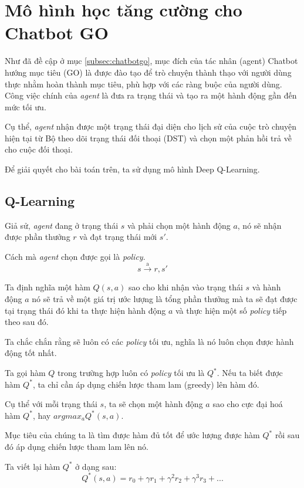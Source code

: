 \section{Mô hình học tăng cường cho Chatbot GO}
\label{sec:model}
Như đã đề cập ở mục \ref{subsec:chatbotgo}, mục đích của tác nhân
(agent) Chatbot hướng mục tiêu (GO) là được đào tạo để trò chuyện
thành thạo với người dùng thực nhằm hoàn thành mục tiêu, phù hợp với
các ràng buộc của người dùng. Công việc chính của \textit{agent} là
đưa ra trạng thái và tạo ra một hành động gần đến mức tối ưu.

Cụ thể, \textit{agent} nhận được một trạng thái đại diện cho lịch sử
của cuộc trò chuyện hiện tại từ Bộ theo dõi trạng thái đối thoại (DST)
và chọn một phản hồi trả về cho cuộc đối thoại.

Để giải quyết cho bài toán trên, ta sử dụng mô hình Deep Q-Learning.

\subsection{Q-Learning}
Giả sử, \textit{agent} đang ở trạng thái $s$ và phải chọn một hành động
$a$, nó sẽ nhận được phần thưởng $r$ và đạt trạng thái mới $s'$.

Cách mà \textit{agent} chọn được gọi là \textit{policy}.
\begin{equation*}
    s \xrightarrow{\text{a}} r,s'
\end{equation*}

Ta định nghĩa một hàm $Q(s,a)$ sao cho khi nhận vào trạng thái $s$
và hành động $a$ nó sẽ trả về một giá trị ước lượng là tổng phần thưởng
mà ta sẽ đạt được tại trạng thái đó khi ta thực hiện hành động $a$
và thực hiện một số \textit{policy} tiếp theo sau đó.

Ta chắc chắn rằng sẽ luôn có các \textit{policy} tối ưu, nghĩa là
nó luôn chọn được hành động tốt nhất.

Ta gọi hàm $Q$ trong trường hợp luôn có \textit{policy} tối ưu là
$Q^*$. Nếu ta biết được hàm $Q^*$, ta chỉ cần áp dụng chiến lược
tham lam (greedy) lên hàm đó.

Cụ thể với mỗi trạng thái $s$, ta sẽ chọn một hành động $a$ sao cho
cực đại hoá hàm $Q^*$, hay ${argmax_a}{Q^*}(s,a)$.

Mục tiêu của chúng ta là tìm được hàm đủ tốt để ước lượng được hàm
$Q^*$ rồi sau đó áp dụng chiến lược tham lam lên nó.

Ta viết lại hàm $Q^*$ ở dạng sau:
\begin{equation*}
    Q^*(s,a) = r_0 + {\gamma}r_1 + {\gamma}^{2}r_2 + {\gamma}^{3}r_3 + ...
\end{equation*}

